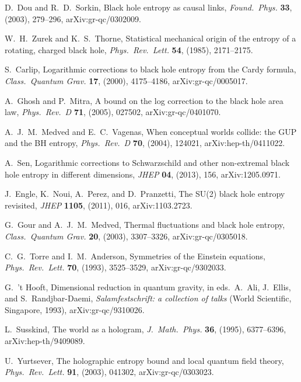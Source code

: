\documentclass[12pt]{article}
\begin{document}
\begin{thebibliography}{999}
 D.\ Dou and R.~D.\ Sorkin, Black hole entropy as 
causal links, \emph{Found.\ Phys.} {\bf 33}, (2003), 279--296,
arXiv:gr-qc/0302009.

 W.\ H.\ Zurek and K.\ S.\ Thorne, Statistical 
mechanical origin of the entropy of a rotating, charged black 
hole, \emph{Phys.\ Rev.\ Lett.} {\bf 54}, (1985), 2171--2175.

 S.\ Carlip, Logarithmic corrections to black hole entropy 
from the Cardy formula, \emph{Class.\ Quantum Grav.} {\bf 17}, (2000), 
4175--4186, arXiv:gr-qc/0005017.

 A.\ Ghosh and P.\ Mitra, A bound on the log correction to 
the black hole area law, \emph{Phys.\ Rev.\ D} {\bf 71}, (2005), 027502,
arXiv:gr-qc/0401070.

 A.~J.~M.\ Medved and E.~C.\ Vagenas, When conceptual 
worlds collide: the GUP and the BH entropy, \emph{Phys.\ Rev.\ D} {\bf 70}, 
(2004), 124021, arXiv:hep-th/0411022.

 A.\ Sen, Logarithmic corrections to Schwarzschild and other 
non-extremal black hole entropy in different dimensions, \emph{JHEP}
{\bf 04}, (2013), 156, arXiv:1205.0971.

 J.\ Engle, K.\ Noui, A.\ Perez, and D.\ Pranzetti,
The SU(2) black hole entropy revisited, \emph{JHEP} {\bf  1105}, (2011),
016, arXiv:1103.2723.

 G.\ Gour and  A.~J.~M.\ Medved, Thermal fluctuations 
and black hole entropy, \emph{Class.\ Quantum Grav.} {\bf 20}, (2003), 
3307--3326, arXiv:gr-qc/0305018.

 C.~G.\ Torre and I.~M.\ Anderson, Symmetries of 
the Einstein equations, \emph{Phys.\ Rev.\ Lett.} {\bf 70}, (1993), 
3525--3529, arXiv:gr-qc/9302033.

  G.\ 't Hooft, Dimensional reduction in 
quantum gravity, in eds.\  A.\ Ali, J.\ Ellis, and S.\ Randjbar-Daemi,
\emph{Salamfestschrift: a collection of talks}  (World Scientific, 
Singapore, 1993), arXiv:gr-qc/9310026.

 L.\ Susskind, The world as a hologram,
\emph{J.\ Math.\ Phys.} {\bf 36}, (1995), 6377--6396,
arXiv:hep-th/9409089.

 U.\ Yurtsever, The holographic entropy 
bound and local quantum field theory, \emph{Phys.\ Rev.\ Lett.} 
{\bf 91}, (2003), 041302, arXiv:gr-qc/0303023.


\end{thebibliography}
\end{document}

